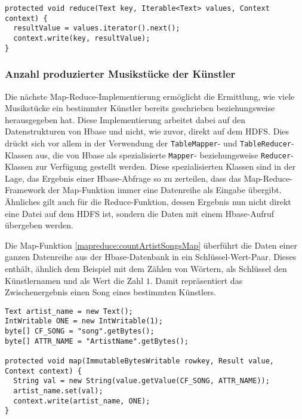 \begin{lstlisting}[caption={Reduce-Funktion zur Entfernung von mehrfachen Musikeinträgen}, label=mapreduce:strippedReduce]
protected void reduce(Text key, Iterable<Text> values, Context context) {
  resultValue = values.iterator().next();
  context.write(key, resultValue);
}
\end{lstlisting}


\subsubsection{Anzahl produzierter Musikstücke der Künstler}
\label{mapred:sec:anzahlSongs}
Die nächste Map-Reduce-Implementierung ermöglicht die Ermittlung, wie viele 
Musikstücke ein bestimmter Künstler bereits geschrieben beziehungsweise herausgegeben
hat. Diese Implementierung arbeitet dabei auf den Datenstrukturen von Hbase und nicht,
wie zuvor, direkt auf dem HDFS. Dies drückt sich vor allem in der Verwendung der 
\texttt{TableMapper}- und \texttt{TableReducer}-Klassen aus, die von Hbase als spezialisierte \texttt{Mapper}- beziehungsweise \texttt{Reducer}-Klassen zur Verfügung gestellt werden.
Diese spezialisierten Klassen sind in der Lage, das Ergebnis einer Hbase-Abfrage so zu
zerteilen, dass das Map-Reduce-Framework der Map-Funktion immer eine Datenreihe 
als Eingabe übergibt. Ähnliches gilt auch für die Reduce-Funktion, dessen Ergebnis
nun nicht direkt eine Datei auf dem HDFS ist, sondern die Daten mit einem Hbase-Aufruf übergeben
werden.

Die Map-Funktion \ref{mapreduce:countArtistSongsMap} überführt die Daten einer ganzen
Datenreihe aus der Hbase-Datenbank in ein Schlüssel-Wert-Paar. Dieses enthält, ähnlich 
dem Beispiel mit dem Zählen von Wörtern, als Schlüssel den Künstlernamen und als Wert
die Zahl $1$. Damit repräsentiert das Zwischenergebnis einen Song eines bestimmten Künstlers.

\begin{lstlisting}[caption={Map-Funktion zur Anzahl der Musikstücke pro Künstler}, label=mapreduce:countArtistSongsMap]
Text artist_name = new Text();
IntWritable ONE = new IntWritable(1);
byte[] CF_SONG = "song".getBytes();
byte[] ATTR_NAME = "ArtistName".getBytes();

protected void map(ImmutableBytesWritable rowkey, Result value, Context context) {
  String val = new String(value.getValue(CF_SONG, ATTR_NAME));
  artist_name.set(val);
  context.write(artist_name, ONE);
}
\end{lstlisting}

